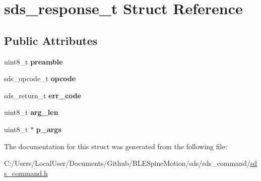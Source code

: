 \hypertarget{structsds__response__t}{}\section{sds\+\_\+response\+\_\+t Struct Reference}
\label{structsds__response__t}
\subsection*{Public Attributes}
\begin{DoxyCompactItemize}
\item 
\mbox{\label{structsds__response__t_adb3488ae5b43559b99ac5b50e59e0b12}} 
uint8\+\_\+t {\bfseries preamble}
\item 
\mbox{\label{structsds__response__t_a13287dbf9c7f53b40f3ec2cbbdcc700b}} 
sds\+\_\+opcode\+\_\+t {\bfseries opcode}
\item 
\mbox{\label{structsds__response__t_a507f784636f616f05dfcd77f9643ff70}} 
sds\+\_\+return\+\_\+t {\bfseries err\+\_\+code}
\item 
\mbox{\label{structsds__response__t_a701383d7593b3ac3172b3508d899aa91}} 
uint8\+\_\+t {\bfseries arg\+\_\+len}
\item 
\mbox{\label{structsds__response__t_a82aceb74ab7bb41ba182a43eb34b8482}} 
uint8\+\_\+t $\ast$ {\bfseries p\+\_\+args}
\end{DoxyCompactItemize}


The documentation for this struct was generated from the following file\+:\begin{DoxyCompactItemize}
\item 
C\+:/\+Users/\+Local\+User/\+Documents/\+Github/\+B\+L\+E\+Spine\+Motion/sds/sds\+\_\+command/\mbox{\hyperlink{sds__command_8h}{sds\+\_\+command.\+h}}\end{DoxyCompactItemize}
